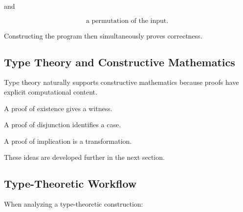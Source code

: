 and

\[
\boxed{
\text{a permutation of the input}.
}
\]

Constructing the program then simultaneously proves correctness.

\subsection{Type Theory and Constructive Mathematics}
\label{subsec:type-theory-constructive-mathematics}

Type theory naturally supports constructive mathematics because proofs have
explicit computational content.

A proof of existence gives a witness.

A proof of disjunction identifies a case.

A proof of implication is a transformation.

These ideas are developed further in the next section.

\subsection{Type-Theoretic Workflow}
\label{subsec:type-theory-workflow}

When analyzing a type-theoretic construction:

